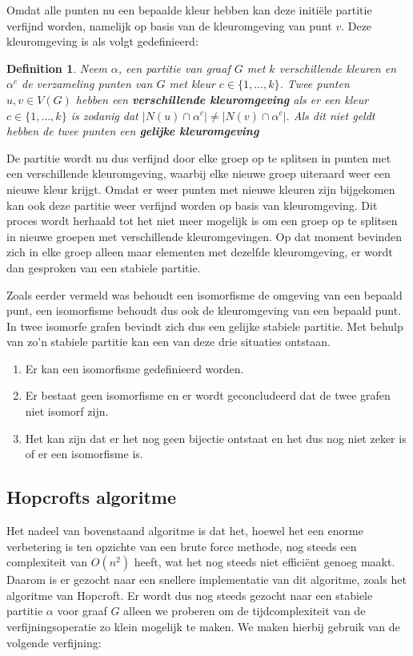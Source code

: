 \documentclass[twoside]{article}
\newtheorem{definition}{Definition}[section]
\begin{document}
\begin{multicols}{2}
Omdat alle punten nu een bepaalde kleur hebben kan deze initi\"ele partitie verfijnd worden, namelijk op basis van de kleuromgeving van punt $v$. Deze kleuromgeving is als volgt gedefinieerd:

\begin{definition}
Neem $\alpha$, een partitie van graaf $G$ met $k$ verschillende kleuren en  $\alpha^{c}$ de verzameling punten van $G$ met kleur $c \in \{1,\ldots,k\}$. Twee punten $u,v \in V(G)$ hebben een \textbf{verschillende kleuromgeving} als er een kleur $c \in \{1,\ldots,k\}$ is zodanig dat $|N(u)\cap\alpha^{c}| \neq |N(v)\cap\alpha^{c}|$. Als dit niet geldt hebben de twee punten een \textbf{gelijke kleuromgeving}
\cite{slides_DFA}
\end{definition}


De partitie wordt nu dus verfijnd door elke groep op te splitsen in punten met een verschillende kleuromgeving, waarbij elke nieuwe groep uiteraard weer een nieuwe kleur krijgt. Omdat er weer punten met nieuwe kleuren zijn bijgekomen kan ook deze partitie weer verfijnd worden op basis van kleuromgeving. Dit proces wordt herhaald tot het niet meer mogelijk is om een groep op te splitsen in nieuwe groepen met verschillende kleuromgevingen. Op dat moment bevinden zich in elke groep alleen maar elementen met dezelfde kleuromgeving, er wordt dan gesproken van een stabiele partitie.

Zoals eerder vermeld was behoudt een isomorfisme de omgeving van een bepaald punt, een isomorfisme behoudt dus ook de kleuromgeving van een bepaald punt. In twee isomorfe grafen bevindt zich dus een gelijke stabiele partitie. Met behulp van zo'n stabiele partitie kan een van deze drie situaties ontstaan.
\begin{enumerate}
\item Er kan een isomorfisme gedefinieerd worden.
\item Er bestaat geen isomorfisme en er wordt geconcludeerd dat  de twee grafen niet isomorf zijn.
\item Het kan zijn dat er het nog geen bijectie ontstaat en het dus nog niet zeker is of er een isomorfisme is.
\end{enumerate}

\subsection{Hopcrofts algoritme}
Het nadeel van bovenstaand algoritme is dat het, hoewel het een enorme verbetering is ten opzichte van een brute force methode, nog steeds een complexiteit van $O(n^2)$ heeft, wat het nog steeds niet efficiënt genoeg maakt. Daarom is er gezocht naar een snellere implementatie van dit algoritme, zoals het algoritme van Hopcroft. Er wordt dus nog steeds gezocht naar een stabiele partitie $\alpha$ voor graaf $G$ alleen we proberen om de tijdcomplexiteit van de verfijningsoperatie zo klein mogelijk te maken. We maken hierbij gebruik van de volgende verfijning:


\end{multicols}
\end{document}
